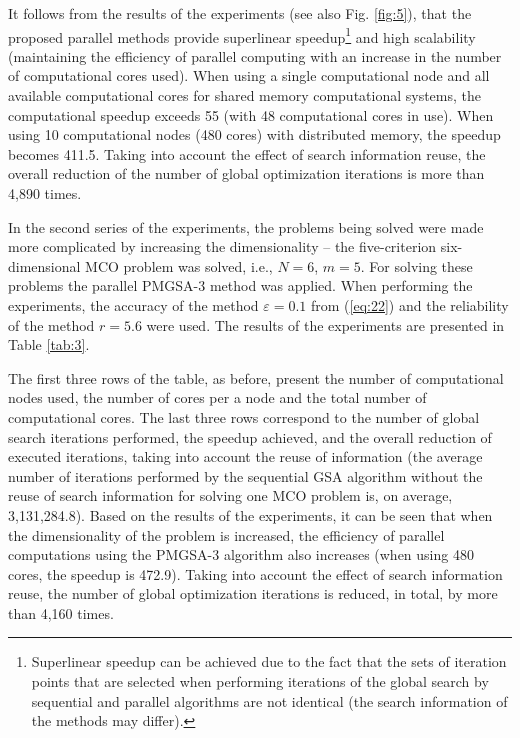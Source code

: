 \documentclass[review]{elsarticle}
\begin{document}
It follows from the results of the experiments (see also Fig. \ref{fig:5}), that the proposed parallel methods provide superlinear speedup\footnote{Superlinear speedup can be achieved due to the fact that the sets of iteration points that are selected when performing iterations of the global search by sequential and parallel algorithms are not identical (the search information of the methods may differ).} and high scalability (maintaining the efficiency of parallel computing with an increase in the number of computational cores used). When using a single computational node and all available computational cores for shared memory computational systems, the computational speedup exceeds 55 (with 48 computational cores in use). When using 10 computational nodes (480 cores) with distributed memory, the speedup becomes 411.5. Taking into account the effect of search information reuse, the overall reduction of the number of global optimization iterations is more than 4,890 times.

In the second series of the experiments, the problems being solved were made more complicated by increasing the dimensionality -- the five-criterion six-dimensional MCO problem was solved, i.e., $N = 6$, $m = 5$. For solving these problems the parallel PMGSA-3 method was applied. When performing the experiments, the accuracy of the method $\varepsilon = 0.1$ from (\ref{eq:22}) and the reliability of the method $r = 5.6$ were used. The results of the experiments are presented in Table \ref{tab:3}.

The first three rows of the table, as before, present the number of computational nodes used, the number of cores per a node and the total number of computational cores. The last three rows correspond to the number of global search iterations performed, the speedup achieved, and the overall reduction of executed iterations, taking into account the reuse of information (the average number of iterations performed by the sequential GSA algorithm without the reuse of search information for solving one MCO problem is, on average, 3,131,284.8).
Based on the results of the experiments, it can be seen that when the dimensionality of the problem is increased, the efficiency of parallel computations using the PMGSA-3 algorithm also increases (when using 480 cores, the speedup is 472.9). Taking into account the effect of search information reuse, the number of global optimization iterations is reduced, in total, by more than 4,160 times.
\end{document}
